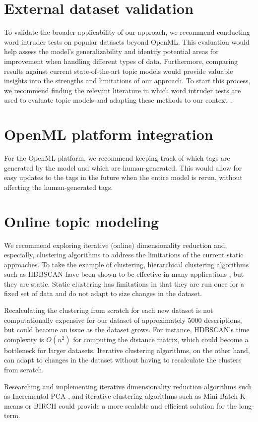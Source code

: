 \section{External dataset validation}
To validate the broader applicability of our approach, we recommend conducting word intruder tests on popular datasets beyond OpenML. This evaluation would help assess the model's generalizability and identify potential areas for improvement when handling different types of data. Furthermore, comparing results against current state-of-the-art topic models would provide valuable insights into the strengths and limitations of our approach. To start this process, we recommend finding the relevant literature in which word intruder tests are used to evaluate topic models and adapting these methods to our context \cite{chang_reading_2009,lau_machine_2014,hoyle_is_2021,newman_evaluating_2010,mimno_optimizing_nodate,musil_exploring_2024,bhatia_automatic_2017}.

\section{OpenML platform integration}
For the OpenML platform, we recommend keeping track of which tags are generated by the model and which are human-generated. This would allow for easy updates to the tags in the future when the entire model is rerun, without affecting the human-generated tags.

\section{Online topic modeling}
We recommend exploring iterative (online) dimensionality reduction and, especially, clustering algorithms to address the limitations of the current static approaches. To take the example of clustering, hierarchical clustering algorithms such as HDBSCAN have been shown to be effective in many applications \cite{campello_density-based_2013, mcinnes_accelerated_2017, mcinnes_hdbscan_2017}, but they are static. Static clustering has limitations in that they are run once for a fixed set of data and do not adapt to size changes in the dataset.

Recalculating the clustering from scratch for each new dataset is not computationally expensive for our dataset of approximately 5000 descriptions, but could become an issue as the dataset grows. For instance, HDBSCAN's time complexity is $O(n^2)$ for computing the distance matrix, which could become a bottleneck for larger datasets. Iterative clustering algorithms, on the other hand, can adapt to changes in the dataset without having to recalculate the clusters from scratch.

Researching and implementing iterative dimensionality reduction algorithms such as Incremental PCA \cite{balsubramani_fast_2013,artac_incremental_2002,dagher_incremental_2010}, and iterative clustering algorithms \cite{montiel_online_2022} such as Mini Batch K-means \cite{bejar_alonso_k-means_2013,hicks_mbkmeans_2021} or BIRCH \cite{zhang_birch_1996} could provide a more scalable and efficient solution for the long-term.